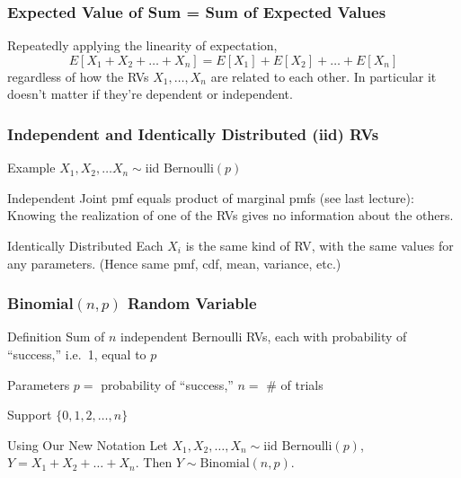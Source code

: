 \documentclass[handout]{beamer}
\begin{document}
\begin{frame}
\frametitle{Expected Value of Sum = Sum of Expected Values}
Repeatedly applying the linearity of expectation,
$$E[X_1 + X_2 + \hdots + X_n] = E[X_1] + E[X_2] + \hdots + E[X_n]$$
regardless of how the RVs $X_1, \hdots, X_n$ are related to each other. In particular it \alert{doesn't matter if they're dependent or independent}.


\end{frame}
\begin{frame}
\frametitle{Independent and Identically Distributed (iid) RVs}

\begin{block}{Example}
	$X_1, X_2, \hdots X_n \sim \mbox{iid Bernoulli}(p)$
\end{block}

\begin{block}{Independent}
Joint pmf equals product of marginal pmfs (see last lecture): Knowing the realization of one of the RVs gives no information about the others.
\end{block}

\begin{block}{Identically Distributed}
Each $X_i$ is the same kind of RV, with the same values for any parameters. (Hence same pmf, cdf, mean, variance, etc.)
\end{block}

\end{frame}
\begin{frame}
\frametitle{Binomial$(n,p)$ Random Variable}

\begin{block}{Definition}
Sum of $n$ independent Bernoulli RVs, each with probability of ``success,'' i.e.\ 1, equal to $p$
\end{block}


\begin{block}{Parameters}
$p =$ probability of ``success,'' $n=$ \# of trials
\end{block}


\begin{block}{Support} 
$\{0, 1, 2, \hdots, n\}$
\end{block}


\begin{alertblock}{Using Our New Notation}
Let $X_1, X_2, \hdots, X_n \sim \mbox{iid Bernoulli}(p)$, $Y = X_1 + X_2 + \hdots + X_n$. Then $Y \sim \mbox{Binomial}(n,p)$.
\end{alertblock}


\end{frame}
\end{document}
